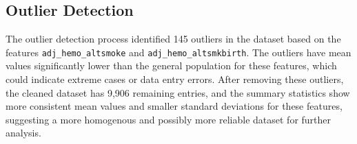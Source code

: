 \subsection{Outlier Detection}


The outlier detection process identified 145 outliers in the dataset based on the features \texttt{adj\_hemo\_altsmoke} and \texttt{adj\_hemo\_altsmkbirth}. The outliers have mean values significantly lower than the general population for these features, which could indicate extreme cases or data entry errors. After removing these outliers, the cleaned dataset has 9,906 remaining entries, and the summary statistics show more consistent mean values and smaller standard deviations for these features, suggesting a more homogenous and possibly more reliable dataset for further analysis.







\clearpage